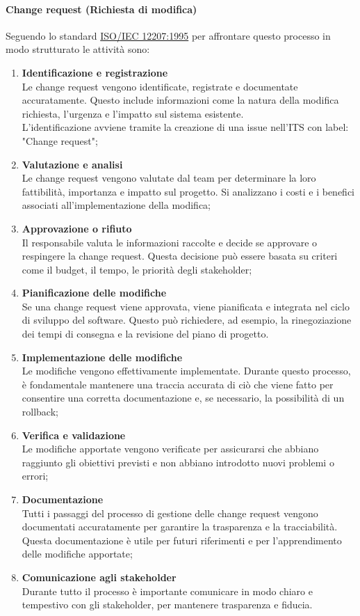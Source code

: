 \paragraph{Change request (Richiesta di modifica)}
Seguendo lo standard \href{https://www.math.unipd.it/~tullio/IS-1/2009/Approfondimenti/ISO_12207-1995.pdf}{ISO/IEC 12207:1995} per affrontare questo processo in modo strutturato le attività sono:
\begin{enumerate}
    \item \textbf{Identificazione e registrazione} \\
    Le change request vengono identificate, registrate e documentate accuratamente. Questo include informazioni come la natura della modifica richiesta, l'urgenza e l'impatto sul sistema esistente. \\
    L'identificazione avviene tramite la creazione di una issue nell'ITS con label: "Change request";
    \item \textbf{Valutazione e analisi} \\
    Le change request vengono valutate dal team per determinare la loro fattibilità, importanza e impatto sul progetto. Si analizzano i costi e i benefici associati all'implementazione della modifica;
    \item \textbf{Approvazione o rifiuto} \\
    Il responsabile valuta le informazioni raccolte e decide se approvare o respingere la change request. Questa decisione può essere basata su criteri come il budget, il tempo, le priorità degli stakeholder;
    \item \textbf{Pianificazione delle modifiche} \\
    Se una change request viene approvata, viene pianificata e integrata nel ciclo di sviluppo del software. Questo può richiedere, ad esempio, la rinegoziazione dei tempi di consegna e la revisione del piano di progetto.
    \item \textbf{Implementazione delle modifiche} \\
    Le modifiche vengono effettivamente implementate. Durante questo processo, è fondamentale mantenere una traccia accurata di ciò che viene fatto per consentire una corretta documentazione e, se necessario, la possibilità di un rollback;
    \item \textbf{Verifica e validazione} \\
    Le modifiche apportate vengono verificate per assicurarsi che abbiano raggiunto gli obiettivi previsti e non abbiano introdotto nuovi problemi o errori;
    \item \textbf{Documentazione} \\
    Tutti i passaggi del processo di gestione delle change request vengono documentati accuratamente per garantire la trasparenza e la tracciabilità. Questa documentazione è utile per futuri riferimenti e per l'apprendimento delle modifiche apportate;
    \item \textbf{Comunicazione agli stakeholder} \\Durante tutto il processo è importante comunicare in modo chiaro e tempestivo con gli stakeholder, per mantenere trasparenza e fiducia.
\end{enumerate}

